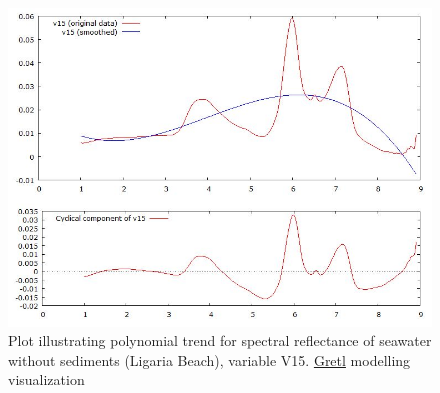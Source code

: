 \documentclass[11pt]{article}
\begin{document}
\begin{appendices}
\begin{figure}[H]
	\begin{center}
		\includegraphics[scale=0.4]{G-polynom-trend-wo.jpg}
		\caption{Plot illustrating polynomial trend for spectral reflectance of seawater without sediments (Ligaria Beach), variable V15. \href{http://gretl.sourceforge.net/}{Gretl} modelling visualization­}
	\end{center}
	\label{fig:A.32}
\end{figure}


\end{appendices}
\end{document}
